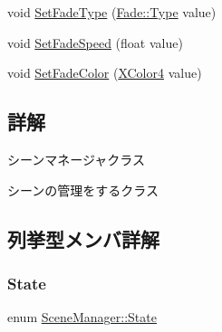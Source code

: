 \begin{DoxyCompactItemize}
\item 
void \mbox{\hyperlink{class_scene_manager_a6c209a6636f6139aec4f48c6555d6d47}{Set\+Fade\+Type}} (\mbox{\hyperlink{class_fade_ac06f27215b454aa05b93c236476d6e80}{Fade\+::\+Type}} value)
\item 
void \mbox{\hyperlink{class_scene_manager_aebb6b6cabf8a855982ddfd7571498369}{Set\+Fade\+Speed}} (float value)
\item 
void \mbox{\hyperlink{class_scene_manager_a4dc85343025336320c32bb66961bda4a}{Set\+Fade\+Color}} (\mbox{\hyperlink{_vector3_d_8h_a680c30c4a07d86fe763c7e01169cd6cc}{X\+Color4}} value)
\end{DoxyCompactItemize}


\subsection{詳解}
シーンマネージャクラス 

シーンの管理をするクラス 

\subsection{列挙型メンバ詳解}
\mbox{\label{class_scene_manager_a68d32794fe1ce945c6a6c380c11a08eb}} 
\subsubsection{\texorpdfstring{State}{State}}
{\footnotesize\ttfamily enum \mbox{\hyperlink{class_scene_manager_a68d32794fe1ce945c6a6c380c11a08eb}{Scene\+Manager\+::\+State}}}

